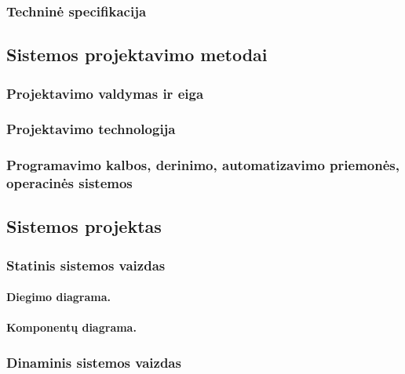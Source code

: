 \subsubsection{Techninė specifikacija}

\lipsum[4]

\subsection{Sistemos projektavimo metodai}

\subsubsection{Projektavimo valdymas ir eiga}

\lipsum[5]

\subsubsection{Projektavimo technologija}

\lipsum[6]

\subsubsection{Programavimo kalbos, derinimo, automatizavimo priemonės, operacinės sistemos}

\lipsum[7]

\subsection{Sistemos projektas}

\subsubsection{Statinis sistemos vaizdas}

\paragraph{Diegimo diagrama.} \lipsum[8][1-4]

\paragraph{Komponentų diagrama.} \lipsum[9][1-4]

\subsubsection{Dinaminis sistemos vaizdas}

\lipsum[10]
